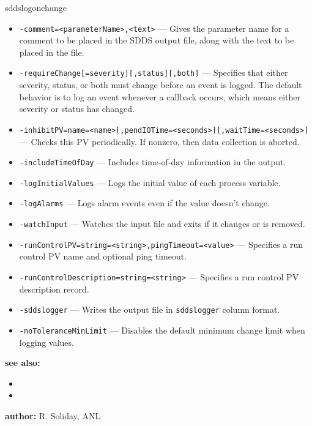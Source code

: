 \begin{sddsprog}{sddslogonchange}
\begin{itemize}
  \item {\tt -comment=<parameterName>,<text>} --- Gives the parameter name for a comment to be placed in the SDDS output file, along with the text to be placed in the file.
  \item {\tt -requireChange[=severity][,status][,both]} --- Specifies that either severity, status, or both must change before an event is logged.  The default behavior is to log an event whenever a callback occurs, which means either severity or status has changed.
  \item {\tt -inhibitPV=name=<name>[,pendIOTime=<seconds>][,waitTime=<seconds>]} --- Checks this PV periodically.  If nonzero, then data collection is aborted.
  \item {\tt -includeTimeOfDay} --- Includes time-of-day information in the output.
  \item {\tt -logInitialValues} --- Logs the initial value of each process variable.
  \item {\tt -logAlarms} --- Logs alarm events even if the value doesn't change.
  \item {\tt -watchInput} --- Watches the input file and exits if it changes or is removed.
  \item {\tt -runControlPV=string=<string>,pingTimeout=<value>} --- Specifies a run control PV name and optional ping timeout.
  \item {\tt -runControlDescription=string=<string>} --- Specifies a run control PV description record.
  \item {\tt -sddslogger} --- Writes the output file in \verb+sddslogger+ column format.
  \item {\tt -noToleranceMinLimit} --- Disables the default minimum change limit when logging values.
\end{itemize}

\item \textbf{see also:}
\begin{itemize}
  \item {}
  \item {}
\end{itemize}
\item \textbf{author:} R. Soliday, ANL
\end{sddsprog}
